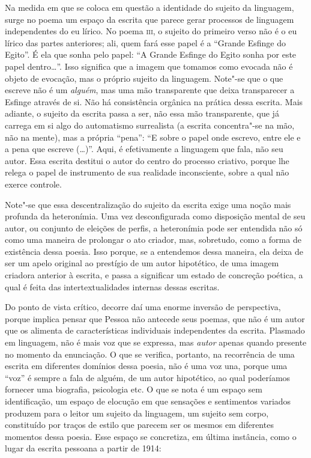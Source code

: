 Na medida em que se coloca em questão a identidade do sujeito da
linguagem, surge no poema um espaço da escrita que parece gerar
processos de linguagem independentes do eu lírico. No poema
\textsc{iii}, o sujeito do primeiro verso não é o eu lírico das partes
anteriores; ali, quem fará esse papel é a ``Grande Esfinge do Egito''. É
ela que sonha pelo papel: ``A Grande Esfinge do Egito sonha por este
papel dentro\ldots{}''. Isso significa que a imagem que tomamos como evocada
não é objeto de evocação, mas o próprio sujeito da linguagem. Note"-se
que o que escreve não é um \emph{alguém}, mas uma mão transparente que
deixa transparecer a Esfinge através de si. Não há consistência orgânica
na prática dessa escrita. Mais adiante, o sujeito da escrita passa a ser,
não essa mão transparente, que já carrega em si algo do automatismo
surrealista (a escrita concentra"-se na mão, não na mente), mas a própria
``pena'': ``E sobre o papel onde escrevo, entre ele e a pena que escreve
(\ldots{})''. Aqui, é efetivamente a linguagem que fala, não seu autor. Essa
escrita destitui o autor do centro do processo criativo, porque lhe
relega o papel de instrumento de sua realidade inconsciente, sobre a
qual não exerce controle.

Note"-se que essa descentralização do sujeito da escrita exige uma noção
mais profunda da heteronímia. Uma vez desconfigurada como disposição
mental de seu autor, ou conjunto de eleições de perfis, a heteronímia
pode ser entendida não só como uma maneira de prolongar o ato criador,
mas, sobretudo, como a forma de existência dessa poesia. Isso porque, se
a entendemos dessa maneira, ela deixa de ser um apelo original ao
prestígio de um autor hipotético, de uma imagem criadora anterior à
escrita, e passa a significar um estado de concreção poética, a qual é
feita das intertextualidades internas dessas escritas.

Do ponto de vista crítico, decorre daí uma enorme inversão de
perspectiva, porque implica pensar que Pessoa não antecede seus poemas,
que não é um autor que os alimenta de características individuais
independentes da escrita. Plasmado em linguagem, não é mais voz que se
expressa, mas \emph{autor} apenas quando presente no momento da
enunciação. O que se verifica, portanto, na recorrência de uma escrita
em diferentes domínios dessa poesia, não é uma voz una, porque uma
``voz'' é sempre a fala de alguém, de um autor hipotético, ao qual
poderíamos fornecer uma biografia, psicologia etc. O que se nota é um
espaço sem identificação, um espaço de elocução em que sensações e
sentimentos variados produzem para o leitor um sujeito da linguagem, um
sujeito sem corpo, constituído por traços de estilo que parecem ser os
mesmos em diferentes momentos dessa poesia. Esse espaço se concretiza,
em última instância, como o lugar da escrita pessoana a partir de 1914:

